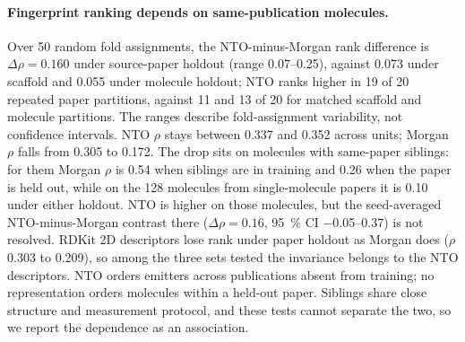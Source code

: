 \paragraph{Fingerprint ranking depends on same-publication molecules.}
Over \num{50} random fold assignments, the NTO-minus-Morgan rank difference is
$\Delta\rho = 0.160$ under source-paper holdout (range \numrange{0.07}{0.25}),
against \num{0.073} under scaffold and \num{0.055} under molecule holdout; NTO ranks
higher in \num{19} of \num{20} repeated paper partitions, against \num{11} and
\num{13} of \num{20} for matched scaffold and molecule partitions. The ranges
describe fold-assignment variability, not confidence intervals. NTO $\rho$ stays
between \num{0.337} and \num{0.352} across units; Morgan $\rho$ falls from
\num{0.305} to \num{0.172}. The drop sits on molecules with same-paper siblings:
for them Morgan $\rho$ is \num{0.54} when siblings are in training and \num{0.26}
when the paper is held out, while on the \num{128} molecules from single-molecule
papers it is \num{0.10} under either holdout. NTO is higher on those molecules, but
the seed-averaged NTO-minus-Morgan contrast there ($\Delta\rho = \num{0.16}$,
\qty{95}{\percent} CI \numrange{-0.05}{0.37}) is not resolved. RDKit 2D
descriptors lose rank under paper holdout as Morgan does ($\rho$ \num{0.303} to
\num{0.209}), so among the three sets tested the invariance belongs to the NTO
descriptors. NTO orders emitters across publications absent from training; no
representation orders molecules within a held-out paper. Siblings share close
structure and measurement protocol, and these tests cannot separate the two, so we
report the dependence as an association.

